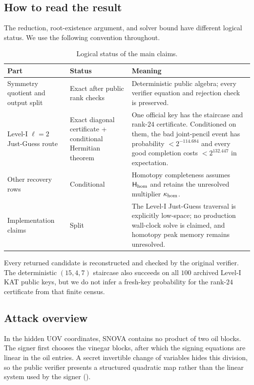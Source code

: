 \documentclass[11pt]{article}
\newcommand{\SNOVA}{\textsf{SNOVA}}
\begin{document}
\subsection{How to read the result}

The reduction, root-existence argument, and solver bound have different
logical status.  We use the following convention throughout.

\begin{table}[H]
\centering
\caption{Logical status of the main claims.}
\label{tab:logical-status}
\footnotesize
\renewcommand{\arraystretch}{1.04}
\begin{tabularx}{0.98\textwidth}{@{}>{\raggedright\arraybackslash}p{}>{\raggedright\arraybackslash}p{}X@{}}
\toprule
Part & Status & Meaning\\
\midrule
Symmetry quotient and output split & Exact after public rank checks & Deterministic public algebra; every verifier equation and rejection check is preserved.\\
Level-I $\ell=2$ Just-Guess route & Exact diagonal certificate + conditional Hermitian theorem & One official key has the staircase and rank-$24$ certificate.  Conditioned on them, the bad joint-pencil event has probability $<2^{-114.684}$ and every good completion costs $<2^{132.447}$ in expectation.\\
Other recovery rows & Conditional & Homotopy completeness assumes $\mathsf H_{\rm hom}$ and retains the unresolved multiplier $\kappa_{\rm hom}$.\\
Implementation claims & Split & The Level-I Just-Guess traversal is explicitly low-space; no production wall-clock solve is claimed, and homotopy peak memory remains unresolved.\\
\bottomrule
\end{tabularx}
\end{table}

Every returned candidate is reconstructed and checked by the original verifier.
The deterministic $(15,4,7)$ staircase also succeeds on all $100$ archived
Level-I KAT public keys, but we do not infer a fresh-key probability for the
rank-$24$ certificate from that finite census.

\subsection{Attack overview}

In the hidden UOV coordinates, \SNOVA{} contains no product of two oil
blocks.  The signer first chooses the vinegar blocks, after which the signing
equations are linear in the oil entries.  A secret invertible change of
variables hides this division, so the public verifier presents a structured
quadratic map rather than the linear system used by the signer
().
\end{document}
